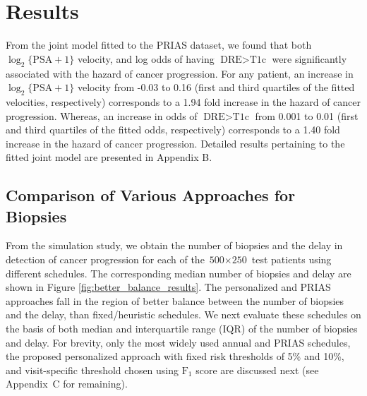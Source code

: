 
\section{Results}
\label{sec:results}
From the joint model fitted to the PRIAS dataset, we found that both $\log_2 \{\mbox{PSA} + 1\}$ velocity,  and log odds of having $\mbox{DRE} > \mbox{T1c}$  were significantly associated with the hazard of cancer progression. For any patient, an increase in $\log_2 \{\mbox{PSA} + 1\}$ velocity from -0.03 to 0.16 (first and third quartiles of the fitted velocities, respectively) corresponds to a 1.94 fold increase in the hazard of cancer progression. Whereas, an increase in odds of $\mbox{DRE} > \mbox{T1c}$ from 0.001 to 0.01 (first and third quartiles of the fitted odds, respectively) corresponds to a 1.40 fold increase in the hazard of cancer progression. Detailed results pertaining to the fitted joint model are presented in Appendix B.

\subsection{Comparison of Various Approaches for Biopsies}
From the simulation study, we obtain the number of biopsies and the delay in detection of cancer progression for each of the ${\mbox{500} \times \mbox{250}}$ test patients using different schedules. The corresponding median number of biopsies and delay are shown in Figure \ref{fig:better_balance_results}. The personalized and PRIAS approaches fall in the region of better balance between the number of biopsies and the delay, than fixed/heuristic schedules. We next evaluate these schedules on the basis of both median and interquartile range (IQR) of the number of biopsies and delay. For brevity, only the most widely used annual and PRIAS schedules, the proposed personalized approach with fixed risk thresholds of 5\% and 10\%, and visit-specific threshold chosen using $\mbox{F}_1$ score are discussed next (see Appendix~C for remaining).


